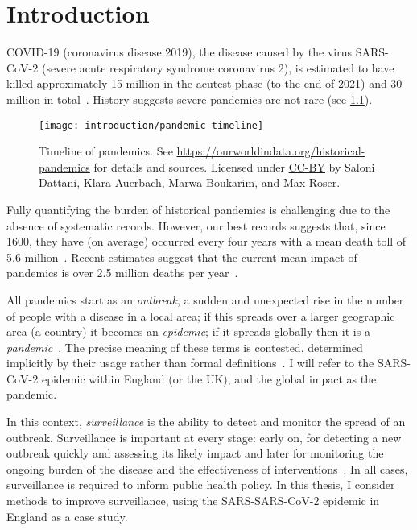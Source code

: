 \documentclass[thesis.tex]{subfiles}
\begin{document}
\chapter{Introduction} \label{intro}

COVID-19 (coronavirus disease 2019), the disease caused by the virus SARS-CoV-2 (severe acute respiratory syndrome coronavirus 2), is estimated to have killed approximately 15 million in the acutest phase (to the end of 2021) and 30 million in total~\autocite{whoCOVIDExcess,economistCOVIDExcess}.
History suggests severe pandemics are not rare (see \cref{intro:fig:pandemic-timeline}).
\begin{figure}
    \texttt{[image: introduction/pandemic-timeline]}
    \caption[Timeline of pandemics.]{%
        Timeline of pandemics.
        See \url{https://ourworldindata.org/historical-pandemics} for details and sources.
        Licensed under \href{https://creativecommons.org/licenses/by/4.0/}{CC-BY} by Saloni Dattani, Klara Auerbach, Marwa Boukarim, and Max Roser.
    }
    \label{intro:fig:pandemic-timeline}
\end{figure}

Fully quantifying the burden of historical pandemics is challenging due to the absence of systematic records.
However, our best records suggests that, since 1600, they have (on average) occurred every four years with a mean death toll of 5.6 million~\autocite{maraniNovelEpidemics}.
Recent estimates suggest that the current mean impact of pandemics is over 2.5 million deaths per year~\autocite{madhavPandemicMortality}.

All pandemics start as an \emph{outbreak}, a sudden and unexpected rise in the number of people with a disease in a local area; if this spreads over a larger geographic area (\eg a country) it becomes an \emph{epidemic}; if it spreads globally then it is a \emph{pandemic}~\autocite{grennanPandemic}.
The precise meaning of these terms is contested, determined implicitly by their usage rather than formal definitions~\autocite{morensPandemic,doshiElusive}.
I will refer to the SARS-CoV-2 epidemic within England (or the UK), and the global impact as the pandemic.

In this context, \emph{surveillance} is the ability to detect and monitor the spread of an outbreak.
Surveillance is important at every stage: early on, for detecting a new outbreak quickly and assessing its likely impact and later for monitoring the ongoing burden of the disease and the effectiveness of interventions~\autocite{whoFluSurveillance}.
In all cases, surveillance is required to inform public health policy.
In this thesis, I consider methods to improve surveillance, using the SARS-SARS-CoV-2 epidemic in England as a case study.
\end{document}
